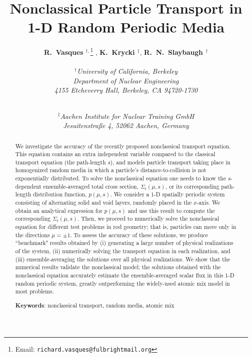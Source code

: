 \documentclass[12pt]{article}
\newcommand{\Keywords}[1]{\vspace{12pt}\par\noindent
{\small{\bf Keywords\/}: #1}}
\begin{document}
\title{Nonclassical Particle Transport in 1-D Random Periodic Media}
\author{{\bf R.\ Vasques $^{\dagger,}$}\footnote{Email: \texttt{richard.vasques@fulbrightmail.org}} , {\bf K.\ Krycki $^\ddagger$}, {\bf R.\ N.\ Slaybaugh $^\dagger$}\\ \\
\em {\bf $^\dagger$}University of California, Berkeley\\
\em Department of Nuclear Engineering\\
\em 4155 Etcheverry Hall, Berkeley, CA 94720-1730\\
\and \\
\em {\bf $^\ddagger$}Aachen Institute for Nuclear Training GmbH \\
\em Jesuitenstraße 4, 52062 Aachen, Germany}
\date{}
\maketitle

\begin{abstract}

We investigate the accuracy of the recently proposed nonclassical transport equation.
This equation contains an extra independent variable compared to the classical transport equation (the path-length $s$), and models particle transport taking place in homogenized random media in which a particle's distance-to-collision is not exponentially distributed.
To solve the nonclassical equation one needs to know the $s$-dependent ensemble-averaged total cross section, $\Sigma_t(\mu,s)$, or its corresponding path-length distribution function, $p(\mu,s)$.
We consider a 1-D spatially periodic system consisting of alternating solid and void layers, randomly placed in the $x$-axis.
We obtain an analytical expression for $p(\mu,s)$ and use this result to compute the corresponding $\Sigma_t(\mu,s)$.
Then, we proceed to numerically solve the nonclassical equation for different test problems in rod geometry; that is, particles can move only in the directions $\mu=\pm 1$.
To assess the accuracy of these solutions, we produce ``benchmark" results obtained by (i) generating a large number of physical realizations of the system, (ii) numerically solving the transport equation in each realization, and (iii) ensemble-averaging the solutions over all physical realizations.
We show that the numerical results validate the nonclassical model; the solutions obtained with the nonclassical equation accurately estimate the ensemble-averaged scalar flux in this 1-D random periodic system, greatly outperforming the widely-used atomic mix model in most problems. 

\Keywords{nonclassical transport, random media, atomic mix}
\end{abstract}
\end{document}
